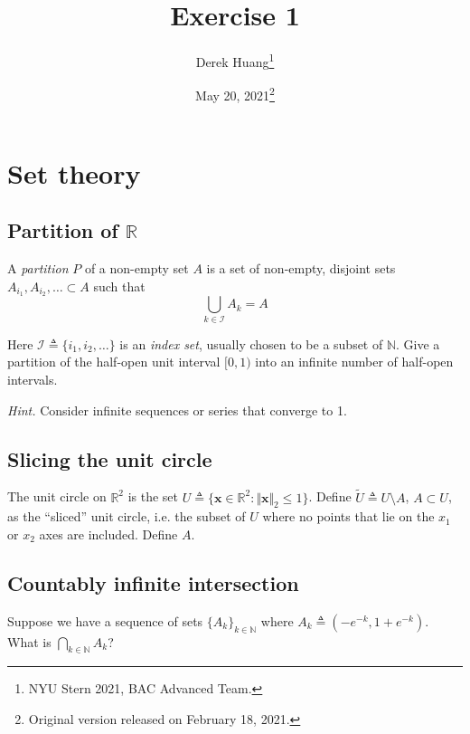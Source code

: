 \documentclass{article}
\title{Exercise 1}
\author{Derek Huang\thanks{NYU Stern 2021, BAC Advanced Team.}}
\date{May 20, 2021\thanks{Original version released on February 18, 2021.}}
\numberwithin{equation}{section}
\begin{document}
\maketitle
\thispagestyle{fancy}

\section{Set theory}

\subsection{Partition of $ \mathbb{R} $}

A \textit{partition} $ P $ of a non-empty set $ A $ is a set of non-empty,
disjoint sets $ A_{i_1}, A_{i_2}, \ldots \subset A $ such that
\begin{equation*}
    \bigcup_{k \in \mathcal{I}} A_k = A
\end{equation*}

Here $ \mathcal{I} \triangleq \{i_1, i_2, \ldots \} $ is an \textit{index set}, usually chosen to be a subset of $ \mathbb{N} $. Give a partition of the
half-open unit interval $ [0, 1) $ into an infinite number of half-open
intervals.

\medskip

\textit{Hint.} Consider infinite sequences or series that converge to 1.

\subsection{Slicing the unit circle}

The unit circle on $ \mathbb{R}^2 $ is the set
$ U \triangleq \{\mathbf{x} \in \mathbb{R}^2 :
\Vert\mathbf{x}\Vert_2 \le 1\} $. Define
$ \tilde{U} \triangleq U \setminus A $, $ A \subset U $, as the ``sliced''
unit circle, i.e. the subset of $ U $ where no points that lie on the $ x_1 $
or $ x_2 $ axes are included. Define $ A $.

\subsection{Countably infinite intersection}

Suppose we have a sequence of sets $ \{A_k\}_{k \in \mathbb{N}} $ where
$ A_k \triangleq \left(-e^{-k}, 1 + e^{-k}\right) $. What is
$ \bigcap_{k \in \mathbb{N}} A_k $?
\end{document}

